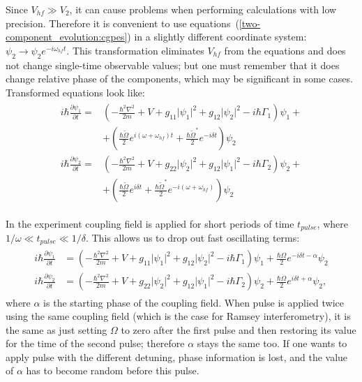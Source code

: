 \documentclass[12pt,notitlepage]{report}
\begin{document}
Since $V_{hf} \gg V_2$, it can cause problems when performing calculations with low precision.
Therefore it is convenient to use equations~(\ref{two-component_evolution:cgpes}) in a slightly different coordinate system:
$\psi_2 \rightarrow \psi_2 e^{-i \omega_{hf} t}$.
This transformation eliminates $V_{hf}$ from the equations and does not change single-time observable values;
but one must remember that it does change relative phase of the components,
which may be significant in some cases.
Transformed equations look like:
\begin{align*}
\begin{split}
i \hbar \frac{\partial \psi_1}{\partial t} = & \left( - \frac{\hbar^2 \nabla^2}{2 m} + V +
g_{11} \lvert \psi_1 \rvert^2 + g_{12} \lvert \psi_2 \rvert^2 - i \hbar \Gamma_1 \right) \psi_1 + \\
& + \left( \frac{\hbar \tilde{\Omega}}{2}e^{i (\omega + \omega_{hf}) t} + \frac{\hbar \tilde{\Omega}^*}{2}e^{-i \delta t} \right) \psi_2 \\
i \hbar \frac{\partial \psi_2}{\partial t} = & \left( - \frac{\hbar^2 \nabla^2}{2 m} + V +
g_{22} \lvert \psi_2 \rvert^2 + g_{12} \lvert \psi_1 \rvert^2 - i \hbar \Gamma_2 \right) \psi_2 + \\
& + \left( \frac{\hbar \tilde{\Omega}}{2}e^{i \delta t} + \frac{\hbar \tilde{\Omega}^*}{2}e^{-i (\omega + \omega_{hf})} \right) \psi_2
\end{split}
\end{align*}

In the experiment coupling field is applied for short periods of time $t_{pulse}$,
where $1 / \omega \ll t_{pulse} \ll 1 / \delta$.
This allows us to drop out fast oscillating terms:
\begin{align}
\label{two-component_evolution:cgpes_simplified}
\begin{split}
i \hbar \frac{\partial \psi_1}{\partial t} & = \left( - \frac{\hbar^2 \nabla^2}{2 m} + V +
g_{11} \lvert \psi_1 \rvert^2 + g_{12} \lvert \psi_2 \rvert^2 - i \hbar \Gamma_1 \right) \psi_1 +
\frac{\hbar \Omega}{2}e^{-i \delta t - \alpha} \psi_2 \\
i \hbar \frac{\partial \psi_2}{\partial t} & = \left( - \frac{\hbar^2 \nabla^2}{2 m} + V +
g_{22} \lvert \psi_2 \rvert^2 + g_{12} \lvert \psi_1 \rvert^2 - i \hbar \Gamma_2 \right) \psi_2 +
\frac{\hbar \Omega}{2}e^{i \delta t + \alpha} \psi_2,
\end{split}
\end{align}
where $\alpha$ is the starting phase of the coupling field.
When pulse is applied twice using the same coupling field (which is the case for Ramsey interferometry),
it is the same as just setting $\Omega$ to zero after the first pulse and then restoring its value for the time of the second pulse;
therefore $\alpha$ stays the same too.
If one wants to apply pulse with the different detuning, phase information is lost,
and the value of $\alpha$ has to become random before this pulse.
\end{document}
